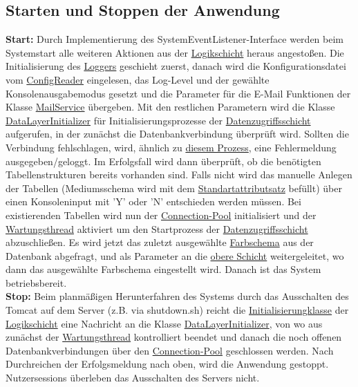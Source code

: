 \documentclass{article}
\begin{document}
\subsection{Starten und Stoppen der Anwendung}
\noindent \textbf{Start:} Durch \hypertarget{Init}{Implementierung} des SystemEventListener-Interface werden beim Systemstart alle weiteren Aktionen aus der \hyperlink{Logikschicht}{Logikschicht} heraus angestoßen. Die Initialisierung des \hyperlink{Logger}{Loggers} geschieht zuerst, danach wird die Konfigurationsdatei vom \hyperlink{Logger}{ConfigReader} eingelesen, das Log-Level und der gewählte Konsolenausgabemodus gesetzt und die Parameter für die E-Mail Funktionen der Klasse \hyperlink{Email}{MailService} übergeben. Mit den restlichen Parametern wird die Klasse \hyperlink{DAOInit}{DataLayerInitializer} für Initialisierungsprozesse der \hyperlink{DAOs}{Datenzugriffsschicht} aufgerufen, in der zunächst die Datenbankverbindung überprüft wird. Sollten die Verbindung fehlschlagen, wird, ähnlich zu \hyperlink{Fehlersequenz}{diesem Prozess}, eine Fehlermeldung ausgegeben/geloggt. Im Erfolgsfall wird dann überprüft, ob die benötigten Tabellenstrukturen bereits vorhanden sind. Falls nicht wird das manuelle Anlegen der Tabellen (Mediumsschema wird mit dem \hyperlink{Standartattributsatz}{Standartattributsatz} befüllt) über einen Konsoleninput mit 'Y' oder 'N' entschieden werden müssen. Bei existierenden Tabellen wird  nun der \hyperlink{Logger}{Connection-Pool} initialisiert und der \hyperlink{Logger}{Wartungsthread} aktiviert um den Startprozess der \hyperlink{DAOs}{Datenzugriffsschicht} abzuschließen. Es wird jetzt das zuletzt ausgewählte \hyperlink{Farbschemaattribut}{Farbschema} aus der Datenbank abgefragt, und als Parameter an die \hyperlink{Logikschicht}{obere Schicht} weitergeleitet, wo dann das ausgewählte Farbschema eingestellt wird. Danach ist das System betriebsbereit. \\
\textbf{Stop:}
Beim planmäßigen Herunterfahren des Systems durch das Ausschalten des Tomcat auf dem Server (z.B. via shutdown.sh) reicht die \hyperlink{Init}{Initialisierungklasse} der \hyperlink{Logikschicht}{Logikschicht} eine Nachricht an die Klasse \hyperlink{Logger}{DataLayerInitializer}, von wo aus zunächst der \hyperlink{Logger}{Wartungsthread} kontrolliert beendet und danach die noch offenen Datenbankverbindungen über den \hyperlink{ConnectionPool}{Connection-Pool} geschlossen werden. Nach Durchreichen der Erfolgsmeldung nach oben, wird die Anwendung gestoppt. Nutzersessions überleben das Ausschalten des Servers nicht.
\end{document}
